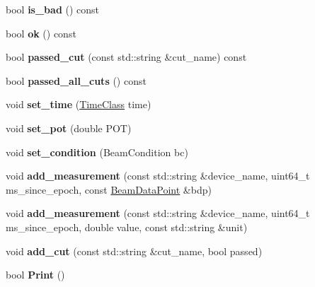 \begin{DoxyCompactItemize}
\item 
\hypertarget{classBeamStatus_af51602157cd9beb020fd01cc72dd95cd}{bool {\bfseries is\-\_\-bad} () const }\label{classBeamStatus_af51602157cd9beb020fd01cc72dd95cd}

\item 
\hypertarget{classBeamStatus_aba458d6774b27d401b393de038668849}{bool {\bfseries ok} () const }\label{classBeamStatus_aba458d6774b27d401b393de038668849}

\item 
\hypertarget{classBeamStatus_ab6b42b298203d0df45cfb46686d491c2}{bool {\bfseries passed\-\_\-cut} (const std\-::string \&cut\-\_\-name) const }\label{classBeamStatus_ab6b42b298203d0df45cfb46686d491c2}

\item 
\hypertarget{classBeamStatus_a34ae2eee9aeb8bfe54d176455e6caaa4}{bool {\bfseries passed\-\_\-all\-\_\-cuts} () const }\label{classBeamStatus_a34ae2eee9aeb8bfe54d176455e6caaa4}

\item 
\hypertarget{classBeamStatus_aa92b44fce12d6ed0a9a14adcdb95487a}{void {\bfseries set\-\_\-time} (\hyperlink{classTimeClass}{Time\-Class} time)}\label{classBeamStatus_aa92b44fce12d6ed0a9a14adcdb95487a}

\item 
\hypertarget{classBeamStatus_a298a8def6b655bf601a73cd0f27ec5b1}{void {\bfseries set\-\_\-pot} (double P\-O\-T)}\label{classBeamStatus_a298a8def6b655bf601a73cd0f27ec5b1}

\item 
\hypertarget{classBeamStatus_aff21cffb9bcc0562b0940839f80b30f4}{void {\bfseries set\-\_\-condition} (Beam\-Condition bc)}\label{classBeamStatus_aff21cffb9bcc0562b0940839f80b30f4}

\item 
\hypertarget{classBeamStatus_a088f4dc4e0db476f939314e6c596ee1c}{void {\bfseries add\-\_\-measurement} (const std\-::string \&device\-\_\-name, uint64\-\_\-t ms\-\_\-since\-\_\-epoch, const \hyperlink{structBeamDataPoint}{Beam\-Data\-Point} \&bdp)}\label{classBeamStatus_a088f4dc4e0db476f939314e6c596ee1c}

\item 
\hypertarget{classBeamStatus_a5ea13f02f3addd9c9cfc406d461db5db}{void {\bfseries add\-\_\-measurement} (const std\-::string \&device\-\_\-name, uint64\-\_\-t ms\-\_\-since\-\_\-epoch, double value, const std\-::string \&unit)}\label{classBeamStatus_a5ea13f02f3addd9c9cfc406d461db5db}

\item 
\hypertarget{classBeamStatus_add23dfa0ed263857cd9f734815051b9a}{void {\bfseries add\-\_\-cut} (const std\-::string \&cut\-\_\-name, bool passed)}\label{classBeamStatus_add23dfa0ed263857cd9f734815051b9a}

\item 
\hypertarget{classBeamStatus_a9c074d793c6a5e55d12265895c736d9e}{bool {\bfseries Print} ()}\label{classBeamStatus_a9c074d793c6a5e55d12265895c736d9e}

\end{DoxyCompactItemize}
